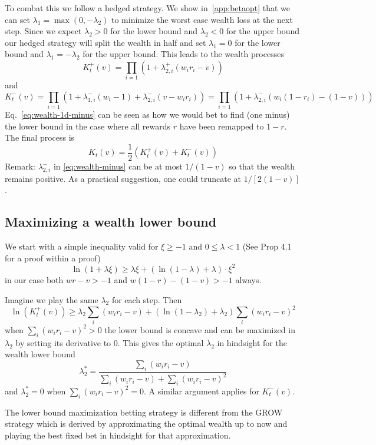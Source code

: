To combat this we follow a hedged strategy. 
We show 
in~\ref{app:betaopt} that we can set $\lambda_1=\max(0,-\lambda_2)$ to minimize the worst case wealth loss at the next step.
Since we expect $\lambda_2>0$ for the lower bound and $\lambda_2<0$ 
for the upper bound our hedged strategy will 
split the wealth in 
half and set $\lambda_1=0$ for the lower bound and $\lambda_1=-\lambda_2$ 
for the upper bound. This leads to the wealth processes
\[
K_t^{+}(v)=\prod_{i=1} (1+\lambda_{2,i}^{+} (w_i r_i -v))
\]
and
\begin{equation}\label{eq:wealth-1d-minus}
K_t^{-}(v)=\prod_{i=1} (1+\lambda_{1,i}^{-}(w_i-1)+\lambda_{2,i}^{-} (v-w_i r_i))
=\prod_{i=1} (1+\lambda_{2,i}^{-} (w_i (1-r_i)-(1-v)))
\end{equation}
Eq.~\eqref{eq:wealth-1d-minus} 
can be seen as how we would bet to find (one minus) the 
lower bound in the case where all rewards $r$ have been remapped 
to $1-r$. The final process is 
\[
K_t(v)=\frac{1}{2}(K_t^{+}(v)+K_t^{-}(v))
\]
Remark: $\lambda_{2,i}^{-}$ in \eqref{eq:wealth-minus} can be at most $1/(1-v)$ so that the wealth remains positive. As a practical suggestion, one could truncate at $1/[2(1-v)]$.

\subsection{Maximizing a wealth lower bound}

We start with a simple inequality valid for $\xi\geq-1$ and 
$0\leq \lambda < 1$ (See \cite{fan2015exponential} Prop 4.1 for a proof within a proof)
\begin{equation}
\ln(1+\lambda \xi) \geq \lambda \xi+\left(\ln\left(1-\lambda\right)+\lambda\right)\cdot \xi^{2}
\label{eq:fanbound}
\end{equation}
in our case both $wr-v>-1$ and $w(1-r)-(1-v)>-1$ always.

Imagine we play the same $\lambda_2$ for each step. Then
\[
\ln(K_t^{+}(v)) \geq \lambda_2 \sum_i (w_i r_i -v) + \left(\ln\left(1-\lambda_2\right)+\lambda_2\right) \sum_i (w_i r_i -v)^2
\]
when $\sum_i (w_i r_i -v)^2>0$ the lower bound is concave and can 
be maximized in $\lambda_2$ by setting its derivative to 0. This gives
the optimal $\lambda_2$ in hindsight for the wealth lower bound 
\[
\lambda_2^* = \frac{\sum_i (w_i r_i -v)}{\sum_i (w_i r_i -v)+\sum_i (w_i r_i -v)^2}
\]
and $\lambda_2^*=0$ when $\sum_i (w_i r_i -v)^2=0$. A similar argument 
applies for $K_t^{-}(v)$.

The lower bound maximization betting strategy is different from 
the GROW strategy \cite{waudby-smith_variance-adaptive_2020} 
which is derived by approximating the optimal wealth up to now 
and playing the best fixed bet in hindsight for that approximation.

